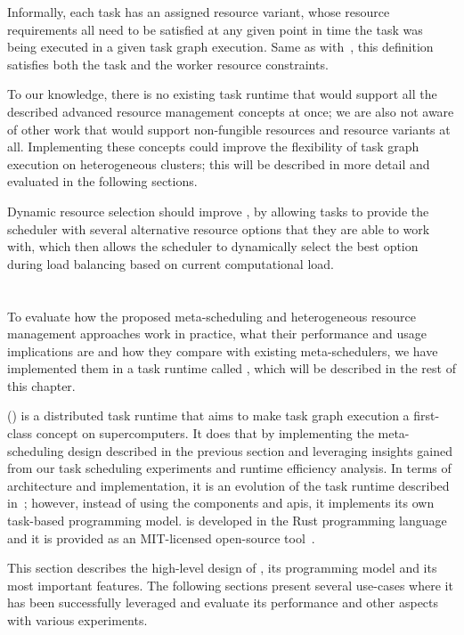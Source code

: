 \vspace{1mm}Informally, each task has an assigned resource variant, whose resource requirements
all need to be satisfied at any given point in time the task was being executed in a given
task graph execution. Same as with~, this definition satisfies both the task
and the worker resource constraints.

To our knowledge, there is no existing task runtime that would support all the described advanced
resource management concepts at once; we are also not aware of other work that would support
non-fungible resources and resource variants at all. Implementing these concepts could improve the
flexibility of task graph execution on heterogeneous clusters; this will be described in more
detail and evaluated in the following sections.

Dynamic resource selection should improve \efficiency{}, by allowing tasks to provide the
scheduler with several alternative resource options that they are able to work with, which then
allows the scheduler to dynamically select the best option during load balancing based on
current computational load.

\section{\hyperqueue{}}
\label{sec:hyperqueue}
To evaluate how the proposed meta-scheduling and heterogeneous resource management approaches work
in practice, what their performance and usage implications are and how they compare with existing
meta-schedulers, we have implemented them in a task runtime called \hyperqueue{}, which
will be described in the rest of this chapter.

\hyperqueue{} (\hq{}) is a distributed task runtime that aims to make task graph execution a
first-class concept on supercomputers. It does that by implementing the meta-scheduling design
described in the previous section and leveraging insights gained from our task scheduling
experiments and \dask{} runtime efficiency analysis. In terms of architecture and
implementation, it is an evolution of the \rsds{} task runtime described
in~; however, instead of using the \dask{} components and
\glspl{api}, it implements its own task-based programming model.
\hyperqueue{} is developed in the Rust programming language~\cite{rust} and
it is provided as an \mbox{MIT-licensed} open-source tool~\cite{hq_github}.

This section describes the high-level design of \hyperqueue{}, its programming model and
its most important features. The following sections present several use-cases where it has been
successfully leveraged and evaluate its performance and other aspects with various experiments.

